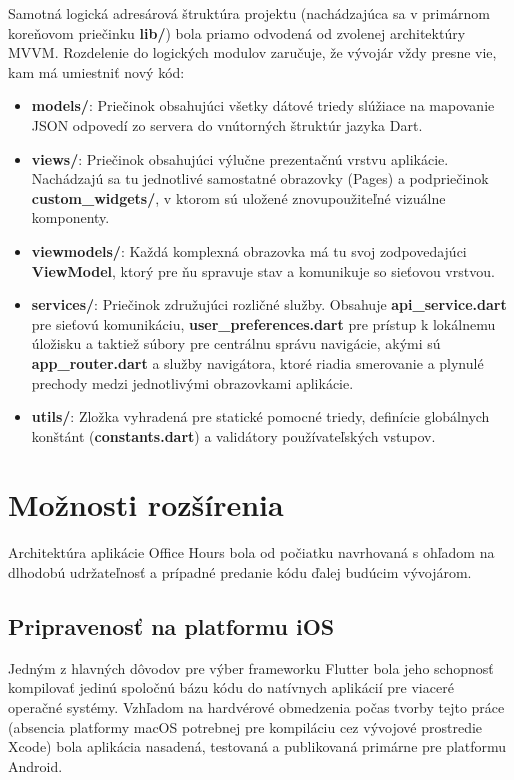 Samotná logická adresárová štruktúra projektu (nachádzajúca sa v primárnom koreňovom priečinku \textbf{lib/}) bola priamo odvodená od zvolenej architektúry MVVM. Rozdelenie do logických modulov zaručuje, že vývojár vždy presne vie, kam má umiestniť nový kód:
\begin{itemize}
    \item \textbf{models/}: Priečinok obsahujúci všetky dátové triedy slúžiace na mapovanie JSON odpovedí zo servera do vnútorných štruktúr jazyka Dart.
    \item \textbf{views/}: Priečinok obsahujúci výlučne prezentačnú vrstvu aplikácie. Nachádzajú sa tu jednotlivé samostatné obrazovky (Pages) a podpriečinok \textbf{custom\_widgets/}, v ktorom sú uložené znovupoužiteľné vizuálne komponenty.
    \item \textbf{viewmodels/}: Každá komplexná obrazovka má tu svoj zodpovedajúci \textbf{ViewModel}, ktorý pre ňu spravuje stav a komunikuje so sieťovou vrstvou.
    \item \textbf{services/}: Priečinok združujúci rozličné služby. Obsahuje \textbf{api\_service.dart} pre sieťovú komunikáciu, \textbf{user\_preferences.dart} pre prístup k lokálnemu úložisku a taktiež súbory pre centrálnu správu navigácie, akými sú \textbf{app\_router.dart} a služby navigátora, ktoré riadia smerovanie a plynulé prechody medzi jednotlivými obrazovkami aplikácie.
    \item \textbf{utils/}: Zložka vyhradená pre statické pomocné triedy, definície globálnych konštánt (\textbf{constants.dart}) a validátory používateľských vstupov.
\end{itemize}

\section{Možnosti rozšírenia}
Architektúra aplikácie Office Hours bola od počiatku navrhovaná s ohľadom na dlhodobú udržateľnosť a prípadné predanie kódu ďalej budúcim vývojárom.

\subsection{Pripravenosť na platformu iOS}
Jedným z hlavných dôvodov pre výber frameworku Flutter bola jeho schopnosť kompilovať jedinú spoločnú bázu kódu do natívnych aplikácií pre viaceré operačné systémy. Vzhľadom na hardvérové obmedzenia počas tvorby tejto práce (absencia platformy macOS potrebnej pre kompiláciu cez vývojové prostredie Xcode) bola aplikácia nasadená, testovaná a publikovaná primárne pre platformu Android.

